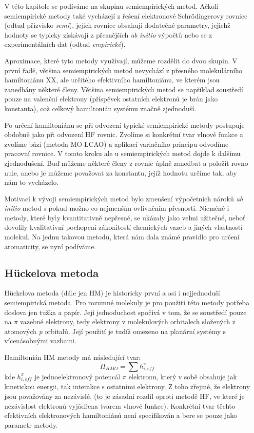 V této kapitole se podíváme na skupinu semiempirických metod. Ačkoli semiempirické metody také vycházejí z řešení elektronové Schr\"{o}dingerovy rovnice (odtud přízvisko \textit{semi}), jejich rovnice obsahují dodatečné parametry, jejichž hodnoty se typicky získávají z přesnějších \textit{ab initio} výpočtů nebo se z experimentálních dat (odtud \textit{empirické}).

Aproximace, které tyto metody využívají, můžeme rozdělit do dvou skupin. V první řadě, většina semiempirických metod nevychází z přesného molekulárního hamiltoniánu XX, ale určitého efektivního hamiltoniánu, ve kterém jsou zanedbány některé členy. Většina semiempirických metod se například soustředí pouze na valenční elektrony (příspěvek ostatních elektronů je brán jako konstanta), což celkový hamiltonián systému značně zjednoduší.

Po určení hamiltoniánu se při odvození typické semiempirické metody postupuje obdobně jako při odvození HF rovnic. Zvolíme si konkrétní tvar vlnové funkce a zvolíme bázi (metoda MO-LCAO) a aplikací variačního principu odvodíme pracovní rovnice. V tomto kroku ale u semiempirických metod dojde k dalšímu zjednodušení. Buď můžeme některé členy z rovnic úplně zanedbat a položit rovno nule, anebo je můžeme považovat za konstantu, jejíž hodnotu určíme tak, aby nám to vycházelo.   

Motivací k vývoji semiempirických metod bylo zmenšení výpočetních nároků \textit{ab initio} metod s pokud možno co nejmenším ovlivněním přesnosti. Nicméně i metody, které byly kvantitativně nepřesné, se ukázaly jako velmi užitečné, neboť dovolily kvalitativní pochopení zákonitostí chemických vazeb a jiných vlastností molekul. Na jednu takovou metodu, která nám dala známé pravidlo  pro určení aromaticity, se nyní podíváme.

\subsection{H\"{u}ckelova metoda}

H\"{u}ckelova metoda (dále jen HM) je historicky první a asi i nejjednoduší semiempirická metoda. Pro rozumné molekuly je pro použití této metody potřeba doslova jen tužka a papír. Její jednoduchost spočívá v tom, že se soustředí pouze na $\pi$ vazebné elektrony,
tedy elektrony v molekulových orbitalech složených z atomových \textit{p} orbitalů.
Její použití je tudíž omezeno na planární systémy s vícenásobnými vazbami. 

Hamiltonián HM metody má následující tvar:
\begin{equation}
H_{HMO}= \sum h_{i, eff}^\pi
\end{equation}
kde $h_{i, eff}^\pi$ je jednoelektronový potencál $\pi$ elektronu, který v sobě obsahuje jak kinetickou energii, tak interakce s ostatními elektrony.
Z toho zřejmé, že elektrony jsou považovány za nezávislé. (to je zásadní rozdíl oproti metodě HF, ve které je nezávislost elektronů vyjádřena  tvarem vlnové funkce). 
Konkrétní tvar těchto efektivních elektronových hamiltoniánů není specifikován a bere se pouze jako parametr metody. 

